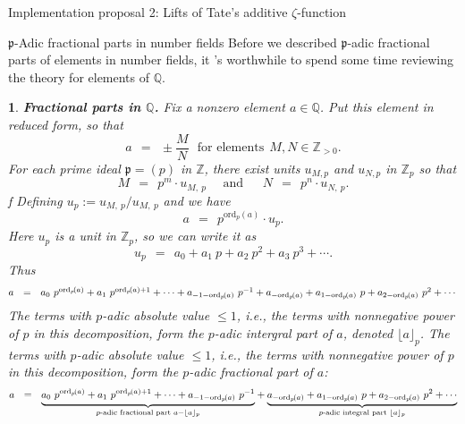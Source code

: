 \documentclass[letterpaper,11pt, reqno]{amsart}
\newtheorem{monodromy theorem}{Monodromy Theorem}[subsection]
\newtheorem{research objectives}{Research objectives}[subsection]
\newtheorem{research question}[theorem]{Research questions}
\newtheorem{aside question}[theorem]{Aside question}
\newtheorem{blank remark}[theorem]{}
\newtheorem{ssubsection}[theorem]{}
\newtheorem{terminology and comment}[theorem]{Terminology and comment}
\newtheorem{purity hypothesis}[theorem]{Purity hypothesis}
\newtheorem{corollary of the purity hypothesis}[theorem]{Corollary of the purity hypothesis}
\newcommand{\QQ} {{\mathbb Q}}
\newcommand{\ZZ} {{\mathbb Z}}
\numberwithin{equation}{theorem}
\begin{document}
\begin{section}{Implementation proposal 2: Lifts of Tate's additive $\zeta$-function}

\begin{subsection}{$\mathfrak{p}$-Adic fractional parts in number fields}
Before we described $\mathfrak{p}$-adic fractional parts of elements in number fields, it 's worthwhile to spend some time reviewing the theory for elements of $\QQ$.

\begin{ssubsection}
{\bf Fractional parts in $\pmb{\QQ}$.}
\normalfont
Fix a nonzero element $a\in\QQ$. Put this element in reduced form, so that
	$$
	a
	\ \ =\ \ 
	\pm
	\frac{M}{N}
	\ \ \ 
	\text{for elements}
	\ \ M,N\in\ZZ_{>0}.
	$$
For each prime ideal $\mathfrak{p}=(p)$ in $\ZZ$, there exist units $u_{M,p}$ and $u_{N,p}$ in $\ZZ_p$ so that
	$$
	M\ \ =\ \ p^m\cdot u_{M\!,\ \!p}
	\ \ \ \ \ \ \text{and}\ \ \ \ \ \ \ 
	N\ \ =\ \ p^n\cdot u_{N\!,\ \!p}.
	$$f
Defining $u_{p}:=u_{M\!,\ \!p}/u_{M\!,\ \!p}$ and we have
	$$
	a
	\ \ =\ \ 
	p^{\text{ord}_{p\!}(a)}\cdot u_{p}.
	$$
Here $u_p$ is a unit in $\mathbb{Z}_p$, so we can write it as
	$$
	u_p
	\ \ =\ \ 
	a_0 +a_1\ \!p + a_2\ \!p^2 + a_3\ \!p^3 + \cdots.
	$$
Thus
	$$
	\scalebox{.92}{$
	a
	\ \ =\ \ 
	a_0\ p^{\text{ord}_{p\!}(a)} + a_1\ p^{\text{ord}_{p\!}(a)+1}+\cdots+a_{-1-\text{ord}_{p\!}(a)}\ p^{-1}+a_{-\text{ord}_{p\!}(a)}+a_{1-\text{ord}_{p\!}(a)}\ p+a_{2-\text{ord}_{p\!}(a)}\ p^2+\cdots
	$}
	$$
The terms with $p$-adic absolute value $\le1$, i.e., the terms with nonnegative power of $p$ in this decomposition, form the {\em $p$-adic intergral part of $a$}, denoted $\lfloor a\rfloor_p$. The terms with $p$-adic absolute value $\le1$, i.e., the terms with nonnegative power of $p$ in this decomposition, form the {\em $p$-adic fractional part of $a$}:
	$$
	\scalebox{.92}{$
	a
	\ \ =\ \ 
	\underset{p\text{-adic fractional part }a-\lfloor a\rfloor_p}{\underbrace{a_0\ p^{\text{ord}_{p\!}(a)} + a_1\ p^{\text{ord}_{p\!}(a)+1}+\cdots+a_{-1-\text{ord}_{p\!}(a)}\ p^{-1}}}+
	\underset{p\text{-adic integral part }\lfloor a\rfloor_{p}}{\underbrace{a_{-\text{ord}_{p\!}(a)}+a_{1-\text{ord}_{p\!}(a)}\ p+a_{2-\text{ord}_{p\!}(a)}\ p^2+\cdots}}
	$}
	$$
\end{ssubsection}



\end{subsection}
\end{section}
\end{document}
